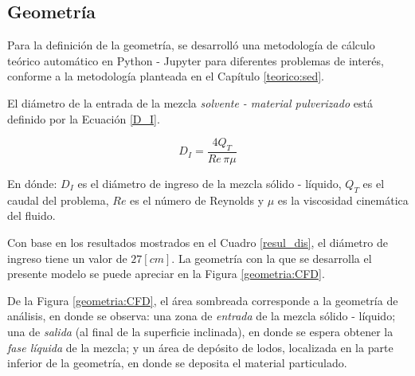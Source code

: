 \subsection{Geometr\'ia} \label{geo}

\noindent
\justify

Para la definici\'on de la geometr\'ia, se desarroll\'o una metodolog\'ia de c\'alculo te\'orico autom\'atico en Python - Jupyter para diferentes problemas de inter\'es, conforme a la metodolog\'ia planteada en el Cap\'itulo \ref{teorico:sed}.

\noindent
\justify

El di\'ametro de la entrada de la mezcla \textit{solvente - material pulverizado} est\'a definido por la Ecuaci\'on \ref{D_I}.

\begin{equation}
	D_I = \frac{4 Q_T}{Re \, \pi \mu}
	\label{D_I}
\end{equation}

\noindent
\justify

En d\'onde: $D_I$ es el di\'ametro de ingreso de la mezcla s\'olido - l\'iquido, $Q_T$ es el caudal del problema, $Re$ es el n\'umero de Reynolds y $\mu$ es la viscosidad cinem\'atica del fluido.

\noindent
\justify

Con base en los resultados mostrados en el Cuadro \ref{resul_dis}, el di\'ametro de ingreso tiene un valor de $27 [cm]$. La geometr\'ia con la que se desarrolla el presente modelo se puede apreciar en la Figura \ref{geometria:CFD}.



\newpage

\noindent
\justify

De la Figura \ref{geometria:CFD}, el \'area sombreada corresponde a la geometr\'ia de an\'alisis, en donde se observa: una zona de \textit{entrada} de la mezcla s\'olido - l\'iquido; una de \textit{salida} (al final de la superficie inclinada), en donde se espera obtener la \textit{fase l\'iquida} de la mezcla; y un \'area de dep\'osito de lodos, localizada en la parte inferior de la geometr\'ia, en donde se deposita el material particulado.